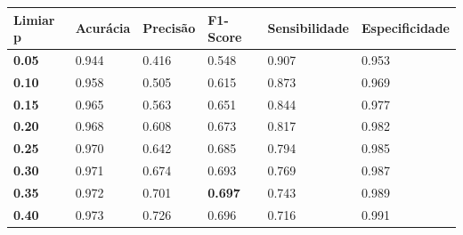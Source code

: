 \begin{table}
\center
\begin{tiny}
\begin{tabular}{|l|l|l|l|l|l|}
\hline
\rowcolor[HTML]{C0C0C0} 
\textbf{Limiar p}                    & \textbf{Acurácia}     & \textbf{Precisão}   & \textbf{F1-Score}         & \textbf{Sensibilidade}   & \textbf{Especificidade}     \\ \hline
\cellcolor[HTML]{EFEFEF}\textbf{0.05}   & 0.944                 & 0.416               & 0.548                     & 0.907                    & 0.953                       \\ \cline{1-6}
\cellcolor[HTML]{EFEFEF}\textbf{0.10}   & 0.958                 & 0.505               & 0.615                     & 0.873                    & 0.969                       \\ \cline{1-6}
\cellcolor[HTML]{EFEFEF}\textbf{0.15}   & 0.965                 & 0.563               & 0.651                     & 0.844                    & 0.977                       \\ \cline{1-6} 
\cellcolor[HTML]{EFEFEF}\textbf{0.20}   & 0.968                 & 0.608               & 0.673                     & 0.817                    & 0.982                       \\ \cline{1-6}
\cellcolor[HTML]{EFEFEF}\textbf{0.25}   & 0.970                 & 0.642               & 0.685                     & 0.794                    & 0.985                       \\ \cline{1-6}
\cellcolor[HTML]{EFEFEF}\textbf{0.30}   & 0.971                 & 0.674               & 0.693                     & 0.769                    & 0.987                       \\ \cline{1-6}
\rowcolor[HTML]{D0D0D0}\textbf{0.35}   & 0.972                 & 0.701               & \textbf{0.697}             & 0.743                    & 0.989                       \\ \cline{1-6} 
\cellcolor[HTML]{EFEFEF}\textbf{0.40}   & 0.973                 & 0.726               & 0.696                     & 0.716                    & 0.991                       \\ \cline{1-6}

\end{tabular}
\end{tiny}
\end{table}
